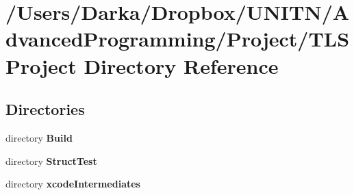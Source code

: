 \section{/\+Users/\+Darka/\+Dropbox/\+U\+N\+I\+T\+N/\+Advanced\+Programming/\+Project/\+T\+L\+S\+Project Directory Reference}
\label{dir_32643621c8b6097b5d7740091a9b8166}
\subsection*{Directories}
\begin{DoxyCompactItemize}
\item 
directory {\bf Build}
\item 
directory {\bf Struct\+Test}
\item 
directory {\bf xcode\+Intermediates}
\end{DoxyCompactItemize}
